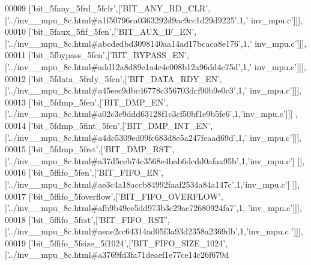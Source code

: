 \begin{DoxyCode}
00009   [\textcolor{stringliteral}{'bit\_5fany\_5frd\_5fclr'},[\textcolor{stringliteral}{'BIT\_ANY\_RD\_CLR'},[\textcolor{stringliteral}{'../inv\_\_mpu\_8c.html#a1f50796ca0363292d9ac9cc1d29d9225'},1,\textcolor{stringliteral}{'
      inv\_mpu.c'}]]],
00010   [\textcolor{stringliteral}{'bit\_5faux\_5fif\_5fen'},[\textcolor{stringliteral}{'BIT\_AUX\_IF\_EN'},[\textcolor{stringliteral}{'../inv\_\_mpu\_8c.html#abcdedbd3098140aa14ad17bcaca8e176'},1,\textcolor{stringliteral}{'
      inv\_mpu.c'}]]],
00011   [\textcolor{stringliteral}{'bit\_5fbypass\_5fen'},[\textcolor{stringliteral}{'BIT\_BYPASS\_EN'},[\textcolor{stringliteral}{'../inv\_\_mpu\_8c.html#add12a8d89e1a4c4e008b12a96dd4c75d'},1,\textcolor{stringliteral}{'
      inv\_mpu.c'}]]],
00012   [\textcolor{stringliteral}{'bit\_5fdata\_5frdy\_5fen'},[\textcolor{stringliteral}{'BIT\_DATA\_RDY\_EN'},[\textcolor{stringliteral}{'../inv\_\_mpu\_8c.html#a45eec9dbc46778c356703dcf90b9e0c3'},1,\textcolor{stringliteral}{'
      inv\_mpu.c'}]]],
00013   [\textcolor{stringliteral}{'bit\_5fdmp\_5fen'},[\textcolor{stringliteral}{'BIT\_DMP\_EN'},[\textcolor{stringliteral}{'../inv\_\_mpu\_8c.html#a02c3e9ddd63128f1c3cf50bf1e9b5fe6'},1,\textcolor{stringliteral}{'inv\_mpu.c'}]]]
      ,
00014   [\textcolor{stringliteral}{'bit\_5fdmp\_5fint\_5fen'},[\textcolor{stringliteral}{'BIT\_DMP\_INT\_EN'},[\textcolor{stringliteral}{'../inv\_\_mpu\_8c.html#a4dc5309ed09fc683d8e5a247feaad69d'},1,\textcolor{stringliteral}{'
      inv\_mpu.c'}]]],
00015   [\textcolor{stringliteral}{'bit\_5fdmp\_5frst'},[\textcolor{stringliteral}{'BIT\_DMP\_RST'},[\textcolor{stringliteral}{'../inv\_\_mpu\_8c.html#a37d5ceb74c3568e4bab6dcdd0afaa95b'},1,\textcolor{stringliteral}{'inv\_mpu.c'}]
      ]],
00016   [\textcolor{stringliteral}{'bit\_5ffifo\_5fen'},[\textcolor{stringliteral}{'BIT\_FIFO\_EN'},[\textcolor{stringliteral}{'../inv\_\_mpu\_8c.html#ae3c4a18accb84992faaf2534a84a147c'},1,\textcolor{stringliteral}{'inv\_mpu.c'}]
      ]],
00017   [\textcolor{stringliteral}{'bit\_5ffifo\_5foverflow'},[\textcolor{stringliteral}{'BIT\_FIFO\_OVERFLOW'},[\textcolor{stringliteral}{'../inv\_\_mpu\_8c.html#afb9b49ce5dd973b3c29ae72680924fa7'},1,\textcolor{stringliteral}{
      'inv\_mpu.c'}]]],
00018   [\textcolor{stringliteral}{'bit\_5ffifo\_5frst'},[\textcolor{stringliteral}{'BIT\_FIFO\_RST'},[\textcolor{stringliteral}{'../inv\_\_mpu\_8c.html#aeae2cc64314ad05f3a93d2358a2369db'},1,\textcolor{stringliteral}{'inv\_mpu.c
      '}]]],
00019   [\textcolor{stringliteral}{'bit\_5ffifo\_5fsize\_5f1024'},[\textcolor{stringliteral}{'BIT\_FIFO\_SIZE\_1024'},[\textcolor{stringliteral}{'../inv\_\_mpu\_8c.html#a3769fd3fa71deaef1e77ce14c26f679d
}
\end{DoxyCode}
